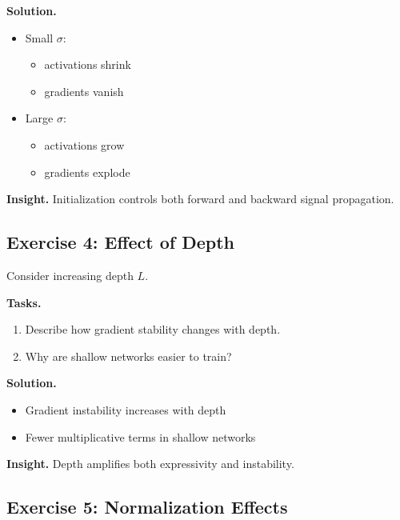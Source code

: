 \medskip

\noindent
\textbf{Solution.}

\begin{itemize}
    \item Small $\sigma$:
    \begin{itemize}
        \item activations shrink
        \item gradients vanish
    \end{itemize}

    \item Large $\sigma$:
    \begin{itemize}
        \item activations grow
        \item gradients explode
    \end{itemize}
\end{itemize}

\medskip

\noindent
\textbf{Insight.}  
Initialization controls both forward and backward signal propagation.

\subsection{Exercise 4: Effect of Depth}

Consider increasing depth $L$.

\medskip

\noindent
\textbf{Tasks.}
\begin{enumerate}
    \item Describe how gradient stability changes with depth.
    \item Why are shallow networks easier to train?
\end{enumerate}

\medskip

\noindent
\textbf{Solution.}

\begin{itemize}
    \item Gradient instability increases with depth
    \item Fewer multiplicative terms in shallow networks
\end{itemize}

\medskip

\noindent
\textbf{Insight.}  
Depth amplifies both expressivity and instability.

\subsection{Exercise 5: Normalization Effects}

